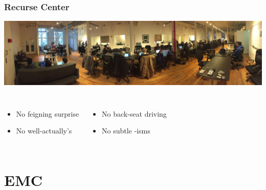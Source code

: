 \documentclass{beamer}
\theoremstyle{mystyle}
\begin{document}

\begin{frame}
\frametitle{Recurse Center}

\begin{center}
	\includegraphics[width=\textwidth]{recursers}
\end{center}

\begin{columns}[c]
		\begin{itemize}
			\item No feigning surprise
			\item No well-actually's
		\end{itemize}
		\begin{itemize}
			\item No back-seat driving
			\item No subtle -isms
		\end{itemize}
\end{columns}

\end{frame}



\section{EMC}
\frame{\tableofcontents[currentsection]}
\end{document}
